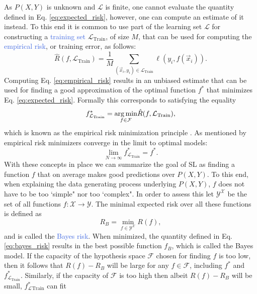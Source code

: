 As $P(X,Y)$ is unknown and $\mathcal{L}$ is finite, one cannot evaluate the quantity defined in Eq. \ref{eq:expected_risk}, however, one can compute an estimate of it instead. To this end it is common to use part of the learning set $\mathcal{L}$ for constructing a \textcolor{RoyalBlue}{training set} $\mathcal{L}_{\text{Train}}$, of size $M$, that can be used for computing the \textcolor{RoyalBlue}{empirical risk}, or training error, as follows:
\begin{equation}
	\hat{R}(f,\mathcal{L}_\text{Train}) = \frac{1}{M} \sum_{(\vec{x}_i, y_i)\in \mathcal{L}_{\text{Train}}} \ell(y_i,f(\vec{x}_i)).
\label{eq:empirical_risk}
\end{equation}
Computing Eq. \ref{eq:empirical_risk} results in an unbiased estimate that can be used for finding a good approximation of the optimal function $f^{*}$ that minimizes Eq. \ref{eq:expected_risk}. Formally this corresponds to satisfying the equality
\begin{equation}
	f^{*}_{\mathcal{L}_{\text{Train}}} = \underset{f\in\mathcal{F}}{\operatorname*{arg\,min}}\hat{R}(f,\mathcal{L}_{\text{Train}}),
\end{equation}
which is known as the empirical risk minimization principle \cite{vapnik1992principles}. As mentioned by \citet{} empirical risk minimizers converge in the limit to optimal models:
\begin{equation}
	\lim_{N \to \infty} f^{*}_{\mathcal{L}_\text{Train}} = f^{*}.
\end{equation}
With these concepts in place we can summarize the goal of SL as finding a function $f$ that on average makes good predictions over $P(X,Y)$. To this end, when explaining the data generating process underlying $P(X,Y)$, $f$ does not have to be too `simple" nor too `complex". In order to assess this let $\mathcal{Y}^{\mathcal{X}}$ be the set of all functions $f:\mathcal{X}\rightarrow\mathcal{Y}$. The minimal expected risk over all these functions is defined as
\begin{equation}
	R_B = \underset{f\in\mathcal{Y}^{\mathcal{X}}}{\min} R(f),
	\label{eq:bayes_risk}
\end{equation}
and is called the \textcolor{RoyalBlue}{Bayes risk}. When minimized, the quantity defined in Eq. \ref{eq:bayes_risk} results in the best possible function $f_B$, which is called the Bayes model. If the capacity of the hypothesis space $\mathcal{F}$ chosen for finding $f$ is too low, then it follows that $R(f)-R_B$ will be large for any $f\in\mathcal{F}$, including $f^{*}$ and $f^{*}_{\mathcal{L}_{\text{Train}}}$. Similarly, if the capacity of $\mathcal{F}$ is too high then albeit $R(f)-R_B$ will be small, $f^{*}_\mathcal{L}_{\text{Train}}$ can fit 
